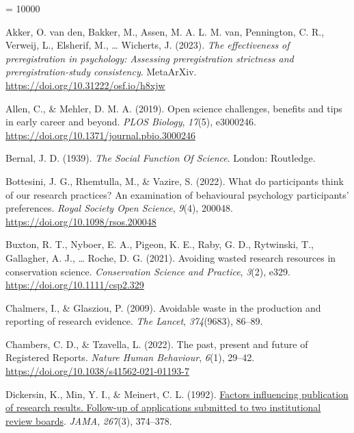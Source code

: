 \documentclass[
  ,jou, a4paper,floatsintext]{apa6}
\newlength{\cslhangindent}
\newlength{\cslentryspacingunit} %
\newenvironment{CSLReferences}[2] %
 {%
  \setlength{\parindent}{0pt}
  \ifodd #1
  \let\oldpar\par
  \def\par{\hangindent=\cslhangindent\oldpar}
  \fi
  \setlength{\parskip}{#2\cslentryspacingunit}
 }%
 {}
\begin{document}
\begingroup

\interlinepenalty = 10000

\hypertarget{refs}{}
\begin{CSLReferences}{1}{0}
\leavevmode{}%
Akker, O. van den, Bakker, M., Assen, M. A. L. M. van, Pennington, C. R., Verweij, L., Elsherif, M., \ldots{} Wicherts, J. (2023). \emph{The effectiveness of preregistration in psychology: {Assessing} preregistration strictness and preregistration-study consistency}. {MetaArXiv}. \url{https://doi.org/10.31222/osf.io/h8xjw}

\leavevmode{}%
Allen, C., \& Mehler, D. M. A. (2019). Open science challenges, benefits and tips in early career and beyond. \emph{PLOS Biology}, \emph{17}(5), e3000246. \url{https://doi.org/10.1371/journal.pbio.3000246}

\leavevmode{}%
Bernal, J. D. (1939). \emph{The {Social Function Of Science}}. {London}: {Routledge}.

\leavevmode{}%
Bottesini, J. G., Rhemtulla, M., \& Vazire, S. (2022). What do participants think of our research practices? {An} examination of behavioural psychology participants' preferences. \emph{Royal Society Open Science}, \emph{9}(4), 200048. \url{https://doi.org/10.1098/rsos.200048}

\leavevmode{}%
Buxton, R. T., Nyboer, E. A., Pigeon, K. E., Raby, G. D., Rytwinski, T., Gallagher, A. J., \ldots{} Roche, D. G. (2021). Avoiding wasted research resources in conservation science. \emph{Conservation Science and Practice}, \emph{3}(2), e329. \url{https://doi.org/10.1111/csp2.329}

\leavevmode{}%
Chalmers, I., \& Glasziou, P. (2009). Avoidable waste in the production and reporting of research evidence. \emph{The Lancet}, \emph{374}(9683), 86--89.

\leavevmode{}%
Chambers, C. D., \& Tzavella, L. (2022). The past, present and future of {Registered Reports}. \emph{Nature Human Behaviour}, \emph{6}(1), 29--42. \url{https://doi.org/10.1038/s41562-021-01193-7}

\leavevmode{}%
Dickersin, K., Min, Y. I., \& Meinert, C. L. (1992). \href{https://www.ncbi.nlm.nih.gov/pubmed/1727960}{Factors influencing publication of research results. {Follow-up} of applications submitted to two institutional review boards}. \emph{JAMA}, \emph{267}(3), 374--378.


\end{CSLReferences}
\end{document}
